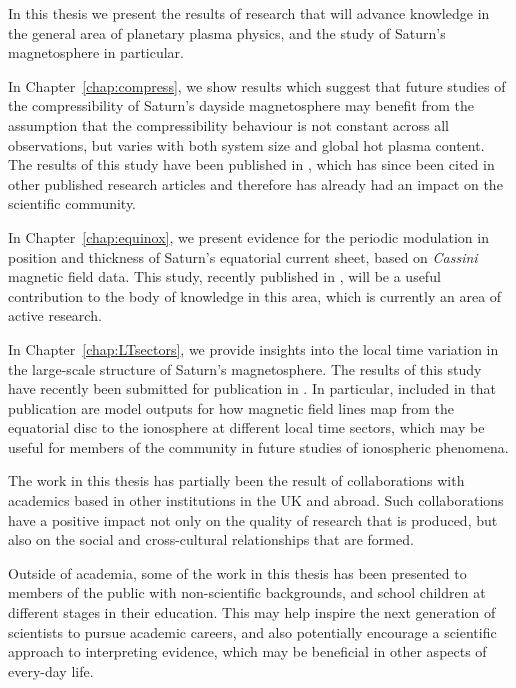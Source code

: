 \begin{impactstatement} %
In this thesis we present the results of research that will advance knowledge in the general area of planetary plasma physics, and the study of Saturn's magnetosphere in particular. 

In Chapter~\ref{chap:compress}, we show results which suggest that future studies of the compressibility of Saturn's dayside magnetosphere may benefit from the assumption that the compressibility behaviour is not constant across all observations,  but varies with both system size and global hot plasma content. The results of this study have been published in \citet{sorba2017}, which has since been cited in other published research articles and therefore has already had an impact on the scientific community. 

In Chapter~\ref{chap:equinox}, we present evidence for the periodic modulation in position and thickness of Saturn's equatorial current sheet, based on \textit{Cassini} magnetic field data. This study, recently published in \citet{sorba2018}, will be a useful contribution to the body of knowledge in this area, which is currently an area of active research.

In Chapter~\ref{chap:LTsectors}, we provide insights into the local time variation in the large-scale structure of Saturn's magnetosphere. 
The results of this study have recently been submitted for publication in \citet{sorba2019}. In particular, included in that publication are model outputs for how magnetic field lines map from the equatorial disc to the ionosphere at different local time sectors, which may be useful for members of the community in future studies of ionospheric phenomena.

The work in this thesis has partially been the result of collaborations with academics based in other institutions in the UK and abroad. Such collaborations have a positive impact not only on the quality of research that is produced, but also on the social and cross-cultural relationships that are formed.

Outside of academia, some of the work in this thesis has been presented to members of the public with non-scientific backgrounds, and school children at different stages in their education. This may help inspire the next generation of scientists to pursue academic careers, and also potentially encourage a scientific approach to interpreting evidence, which may be beneficial in other aspects of every-day life.


\end{impactstatement}
